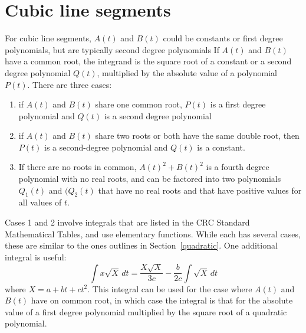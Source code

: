 \documentclass[12pt]{article}
\begin{document}
\section{Cubic line segments}\label{cubic}

For cubic line segments, $A(t)$ and $B(t)$ could be constants or
first degree polynomials, but are typically second degree
polynomials If $A(t)$ and $B(t)$ have a common root, the
integrand is the square root of a constant or a second degree
polynomial $Q(t)$, multiplied by the absolute value of a polynomial
$P(t)$. There are three cases:
\begin{enumerate}
  \item if $A(t)$ and $B(t)$ share one common root, $P(t)$ is a first
	degree polynomial and $Q(t)$ is a second degree polynomial
  \item if $A(t)$ and $B(t)$ share two roots or both have the same
	double root, then $P(t)$ is a second-degree polynomial and
	$Q(t)$ is a constant.
  \item If there are no roots in common, $A(t)^2 + B(t)^2$ is a
	fourth degree polynomial with no real roots, and can be
	factored into two polynomials $Q_1(t)$ and $(Q_2(t)$ that
	have no real roots and that have positive values for all values
	of $t$.
\end{enumerate}

Cases 1 and 2 involve integrals that are listed in the CRC Standard
Mathematical Tables, and use elementary functions. While each has
several cases, these are similar to the ones outlines in
Section~\ref{quadratic}.  One additional integral is useful:
      \[ \int x\sqrt{X}\,dt = \frac{X\sqrt{X}}{3c}
        - \frac{b}{2c}\int\sqrt{X}\,dt \]
where $X = a + bt + ct^2$. This integral can be used for the case
where $A(t)$ and $B(t)$ have on common root, in which case the
integral is that for the absolute value of a first degree polynomial
multiplied by the square root of a quadratic polynomial.
\end{document}
